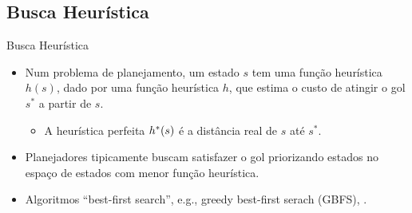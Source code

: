 \documentclass{beamer}
\begin{document}
\subsection{Busca Heurística}
\begin{frame}{Busca Heurística}
\begin{itemize}
  \item Num problema de planejamento, um estado $s$ tem uma função heurística \alert{$h(s)$}, dado por uma função heurística $h$, que estima o \alert{custo de atingir o gol $s^{*}$} a partir de $s$.
  \begin{itemize}
    \item A heurística perfeita \alert{$h^{*}(s)$} é a \alert{distância real} de $s$ até $s^{*}$.
  \end{itemize}
  \pause
  \item Planejadores tipicamente buscam satisfazer o gol \alert{priorizando} estados no espaço de estados com \alert{menor função heurística}.
  \pause
  \item Algoritmos ``best-first search'', e.g., greedy best-first serach (GBFS), \astar.
\end{itemize}
\end{frame}
\end{document}
